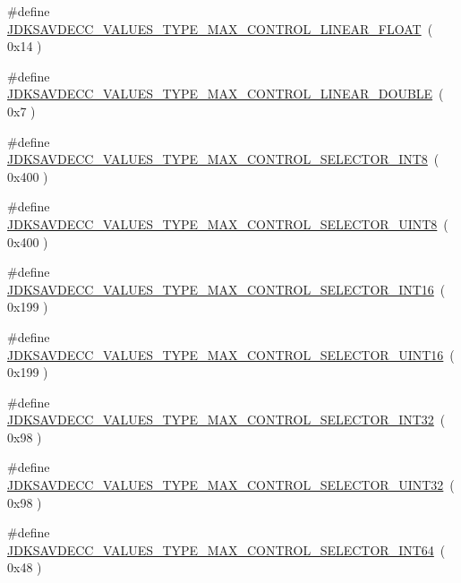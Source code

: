 \begin{DoxyCompactItemize}
\#define \hyperlink{group__values__type__max_ga4f966862d72cb02041d7052ac6b40881}{J\+D\+K\+S\+A\+V\+D\+E\+C\+C\+\_\+\+V\+A\+L\+U\+E\+S\+\_\+\+T\+Y\+P\+E\+\_\+\+M\+A\+X\+\_\+\+C\+O\+N\+T\+R\+O\+L\+\_\+\+L\+I\+N\+E\+A\+R\+\_\+\+F\+L\+O\+AT}~( 0x14 )
\item 
\#define \hyperlink{group__values__type__max_gadaefcdb8541c1dc9a7080a1f63765ffd}{J\+D\+K\+S\+A\+V\+D\+E\+C\+C\+\_\+\+V\+A\+L\+U\+E\+S\+\_\+\+T\+Y\+P\+E\+\_\+\+M\+A\+X\+\_\+\+C\+O\+N\+T\+R\+O\+L\+\_\+\+L\+I\+N\+E\+A\+R\+\_\+\+D\+O\+U\+B\+LE}~( 0x7 )
\item 
\#define \hyperlink{group__values__type__max_gaf0288b1fab7cb732c2bd1765533a8d8a}{J\+D\+K\+S\+A\+V\+D\+E\+C\+C\+\_\+\+V\+A\+L\+U\+E\+S\+\_\+\+T\+Y\+P\+E\+\_\+\+M\+A\+X\+\_\+\+C\+O\+N\+T\+R\+O\+L\+\_\+\+S\+E\+L\+E\+C\+T\+O\+R\+\_\+\+I\+N\+T8}~( 0x400 )
\item 
\#define \hyperlink{group__values__type__max_ga3e4708e1b6799f0a9cbff3fb77e20278}{J\+D\+K\+S\+A\+V\+D\+E\+C\+C\+\_\+\+V\+A\+L\+U\+E\+S\+\_\+\+T\+Y\+P\+E\+\_\+\+M\+A\+X\+\_\+\+C\+O\+N\+T\+R\+O\+L\+\_\+\+S\+E\+L\+E\+C\+T\+O\+R\+\_\+\+U\+I\+N\+T8}~( 0x400 )
\item 
\#define \hyperlink{group__values__type__max_ga6e726ee62ea41d79bc731b6607ed91c4}{J\+D\+K\+S\+A\+V\+D\+E\+C\+C\+\_\+\+V\+A\+L\+U\+E\+S\+\_\+\+T\+Y\+P\+E\+\_\+\+M\+A\+X\+\_\+\+C\+O\+N\+T\+R\+O\+L\+\_\+\+S\+E\+L\+E\+C\+T\+O\+R\+\_\+\+I\+N\+T16}~( 0x199 )
\item 
\#define \hyperlink{group__values__type__max_ga908d37faf92e51467d6f3ead730964ad}{J\+D\+K\+S\+A\+V\+D\+E\+C\+C\+\_\+\+V\+A\+L\+U\+E\+S\+\_\+\+T\+Y\+P\+E\+\_\+\+M\+A\+X\+\_\+\+C\+O\+N\+T\+R\+O\+L\+\_\+\+S\+E\+L\+E\+C\+T\+O\+R\+\_\+\+U\+I\+N\+T16}~( 0x199 )
\item 
\#define \hyperlink{group__values__type__max_ga16fe77a8c46e0aa3e2f13482f1667bab}{J\+D\+K\+S\+A\+V\+D\+E\+C\+C\+\_\+\+V\+A\+L\+U\+E\+S\+\_\+\+T\+Y\+P\+E\+\_\+\+M\+A\+X\+\_\+\+C\+O\+N\+T\+R\+O\+L\+\_\+\+S\+E\+L\+E\+C\+T\+O\+R\+\_\+\+I\+N\+T32}~( 0x98 )
\item 
\#define \hyperlink{group__values__type__max_ga611e9103b882483e5afeab7df86c74fe}{J\+D\+K\+S\+A\+V\+D\+E\+C\+C\+\_\+\+V\+A\+L\+U\+E\+S\+\_\+\+T\+Y\+P\+E\+\_\+\+M\+A\+X\+\_\+\+C\+O\+N\+T\+R\+O\+L\+\_\+\+S\+E\+L\+E\+C\+T\+O\+R\+\_\+\+U\+I\+N\+T32}~( 0x98 )
\item 
\#define \hyperlink{group__values__type__max_ga766b6be255084e2042b1ff75cd9ecafe}{J\+D\+K\+S\+A\+V\+D\+E\+C\+C\+\_\+\+V\+A\+L\+U\+E\+S\+\_\+\+T\+Y\+P\+E\+\_\+\+M\+A\+X\+\_\+\+C\+O\+N\+T\+R\+O\+L\+\_\+\+S\+E\+L\+E\+C\+T\+O\+R\+\_\+\+I\+N\+T64}~( 0x48 )

\end{DoxyCompactItemize}
